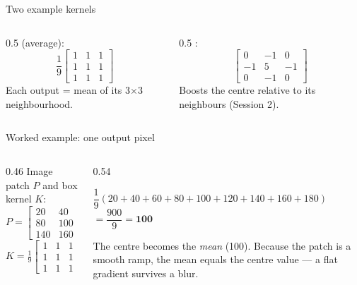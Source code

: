 \documentclass[10pt,aspectratio=169]{beamer}
\begin{document}
\begin{frame}{Two example kernels}
  \begin{columns}[T]
    \begin{column}{0.5\textwidth}
       (average):
      \[
      \frac{1}{9}\begin{bmatrix}1&1&1\\1&1&1\\1&1&1\end{bmatrix}
      \]
      Each output = mean of its 3$\times$3 neighbourhood.
    \end{column}
    \begin{column}{0.5\textwidth}
      :
      \[
      \begin{bmatrix}0&-1&0\\-1&5&-1\\0&-1&0\end{bmatrix}
      \]
      Boosts the centre relative to its neighbours (Session 2).
    \end{column}
  \end{columns}
  \vspace{4pt}
\end{frame}

\begin{frame}{Worked example: one output pixel}
  \begin{columns}[T]
    \begin{column}{0.46\textwidth}
      Image patch $P$ and box kernel $K$:
      \[ P=\begin{bmatrix}20&40&60\\80&100&120\\140&160&180\end{bmatrix} \]
      \[ K=\tfrac{1}{9}\begin{bmatrix}1&1&1\\1&1&1\\1&1&1\end{bmatrix} \]
    \end{column}
    \begin{column}{0.54\textwidth}
      \begin{mathbox}
        $\dfrac{1}{9}(20{+}40{+}60{+}80{+}100{+}120{+}140{+}160{+}180)$\\[2pt]
        $=\dfrac{900}{9}=\mathbf{100}$
      \end{mathbox}
      The centre becomes the \emph{mean} (100). Because the patch is a smooth ramp, the mean
      equals the centre value — a flat gradient survives a blur.
    \end{column}
  \end{columns}
\end{frame}
\end{document}
